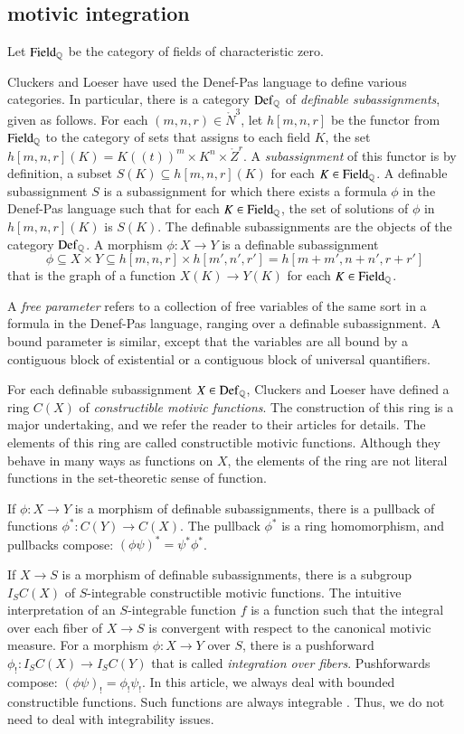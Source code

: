 \subsection{motivic integration}

Let ${\operatorname{Field}}_{\mathbb{Q}}$ be the category of fields of characteristic zero.

Cluckers and Loeser have used the Denef-Pas language to define various
categories.  In particular, there is a category ${\operatorname{Def}}_{\mathbb{Q}}$ of {\it
  definable subassignments}, given as follows.  For each
$(m,n,r)\in\ring{N}^3$, let $h[m,n,r]$ be the functor from
${\operatorname{Field}}_{\mathbb{Q}}$ to the category of sets that assigns to each field
$K$, the set $h[m,n,r](K)=K((t))^m\times K^n\times \ring{Z}^r$.  A
{\it subassignment} of this functor is by definition, a subset $S(K)
\subseteq h[m,n,r](K)$ for each $K\in{\operatorname{Field}}_{\mathbb{Q}}$.  A definable
subassignment $S$ is a subassignment for which there exists a formula
$\phi$ in the Denef-Pas language such that for each
$K\in{\operatorname{Field}}_{\mathbb{Q}}$, the set of solutions of $\phi$ in $h[m,n,r](K)$
is $S(K)$.  The definable subassignments are the objects of the
category ${\operatorname{Def}}_{\mathbb{Q}}$.  A morphism $\phi:X\to Y$ is a definable
subassignment
\[
\phi\subseteq X\times Y
\subseteq h[m,n,r]\times h[m',n',r'] = h[m+m',n+n',r+r']
\]
that is the graph of a function $X(K)\to Y(K)$ for each $K\in
{\operatorname{Field}}_{\mathbb{Q}}$.

A {\it free parameter} refers to a collection of free variables of the
same sort in a formula in the Denef-Pas language, ranging over a
definable subassignment.  A bound parameter is similar, except that
the variables are all bound by a contiguous block of existential or a
contiguous block of universal quantifiers.

For each definable subassignment $X\in {\operatorname{Def}}_{\mathbb{Q}}$, Cluckers and
Loeser have defined a ring $C(X)$ of {\it constructible motivic
  functions}.  The construction of this ring is a major undertaking,
and we refer the reader to their articles for details.  The elements
of this ring are called constructible motivic functions.  Although
they behave in many ways as functions on $X$, the elements of the ring
are not literal functions in the set-theoretic sense of function.

If $\phi:X\to Y$ is a morphism of definable subassignments, there is a
pullback of functions $\phi^*:C(Y)\to C(X)$.  The pullback $\phi^*$ is
a ring homomorphism, and pullbacks compose: $(\phi\psi)^* = \psi^*
\phi^*$.

If $X\to S$ is a morphism of definable subassignments, there is a
subgroup $I_S C(X)$ of $S$-integrable constructible motivic functions.
The intuitive interpretation of an $S$-integrable function $f$ is a
function such that the integral over each fiber of $X\to S$ is
convergent with respect to the canonical motivic measure.  For a
morphism $\phi: X\to Y$ over $S$, there is a pushforward
$\phi_!:I_SC(X)\to I_SC(Y)$ that is called {\it integration over
  fibers}.  Pushforwards compose: $(\phi\psi)_! = \phi_!\psi_!$.  In
this article, we always deal with bounded constructible functions.
Such functions are always integrable
\cite[Prop~12.2.2]{cluckers2008constructible}.  Thus, we do not need
to deal with integrability issues.

